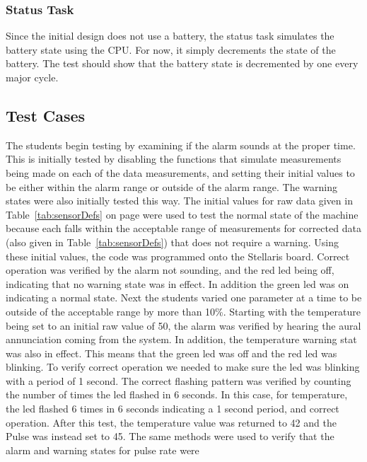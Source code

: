 \documentclass[12pt]{article} %
\begin{document}
    \subsubsection{Status Task} Since the initial design does not use a
    battery, the status task simulates the battery state using the CPU. For
    now, it simply decrements the state of the battery. The test should show
    that the battery state is decremented by one every major cycle.

    \subsection{Test Cases} The students begin testing by examining if the
    alarm sounds at the proper time.  This is initially tested by disabling the
    functions that simulate measurements being made on each of the data
    measurements, and setting their initial values to be either within the
    alarm range or outside of the alarm range. The warning states were also
    initially tested this way. The initial values for raw data given in
    Table~\ref{tab:sensorDefs} on page \pageref{tab:sensorDefs} were used to
    test the normal state of the machine because each falls within the
    acceptable range of measurements for corrected data (also given in
    Table~\ref{tab:sensorDefs}) that does not require a warning.  Using these
    initial values, the code was programmed onto the Stellaris board.  Correct
    operation was verified by the alarm not sounding, and the red led being
    off, indicating that no warning state was in effect. In addition the green
    led was on indicating a normal state. Next the students varied one
    parameter at a time to be outside of the acceptable range by more than
    10\%. Starting with the temperature being set to an initial raw value of
    50, the alarm was verified by hearing the aural annunciation coming from
    the system. In addition, the temperature warning stat was also in effect.
    This means that the green led was off and the red led was blinking. To
    verify correct operation we needed to make sure the led was blinking with a
    period of 1 second. The correct flashing pattern was verified by counting
    the number of times the led flashed in 6 seconds.  In this case, for
    temperature, the led flashed 6 times in 6 seconds indicating a 1 second
    period, and correct operation. After this test, the temperature value was
    returned to 42 and the Pulse was instead set to 45.  The same methods were
    used to verify that the alarm and warning states for pulse rate were
\end{document}
